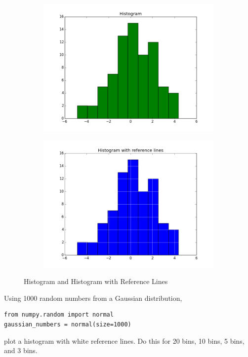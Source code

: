 \begin{figure}
\centering
\begin{subfigure}{.45\textwidth}
\centering
\includegraphics[width=\textwidth]{histogram.png}
\end{subfigure}
\centering
\begin{subfigure}{.45\textwidth}
\centering
\includegraphics[width=\textwidth]{histogram_referenceLines.png}
\end{subfigure}
\caption{Histogram and Histogram with Reference Lines}
\label{fig:histogram}
\end{figure}



\begin{problem}
Using 1000 random numbers from a Gaussian distribution,
\begin{lstlisting}
from numpy.random import normal
gaussian_numbers = normal(size=1000)
\end{lstlisting}
plot a histogram with white reference lines.  Do this for 20 bins, 10 bins, 5 bins, and 3 bins.

\end{problem}

